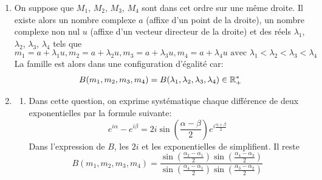 \begin{enumerate}
 \item On suppose que $M_1$, $M_2$, $M_3$, $M_4$ sont dans cet ordre sur une même droite. Il existe alors un nombre complexe $a$ (affixe d'un point de la droite), un nombre complexe non nul $u$ (affixe d'un vecteur directeur de la droite) et des réels $\lambda_1$, $\lambda_2$, $\lambda_3$, $\lambda_4$ tels que
\begin{displaymath}
 m_1=a+\lambda_1u,m_2=a+\lambda_2u, m_3=a+\lambda_3u, m_4=a+\lambda_4u \text{ avec }
\lambda_1 < \lambda_2 < \lambda_3 < \lambda_4  
\end{displaymath}
La famille est alors dans une configuration d'égalité car:
\begin{displaymath}
 B(m_1,m_2,m_3,m_4) = B(\lambda_1,\lambda_2,\lambda_3,\lambda_4)\in \mathbb{R}_+^*
\end{displaymath}

 \item 
\begin{enumerate}
 \item Dans cette question, on exprime systématique chaque différence de deux exponentielles par la formule suivante:
\begin{displaymath}
 e^{i\alpha}-e^{i\beta} = 2i\sin(\frac{\alpha - \beta}{2})e^{i\frac{\alpha + \beta}{2}}
\end{displaymath}
Dans l'expression de $B$, les $2i$ et les exponentielles de simplifient. Il reste
\begin{displaymath}
 B(m_1,m_2,m_3,m_4)=\frac{\sin\left(\frac{\alpha_2 - \alpha_1}{2}\right) \sin\left(\frac{\alpha_4 - \alpha_3}{2}\right)}
                         {\sin\left(\frac{\alpha_4 - \alpha_1}{2}\right) \sin\left(\frac{\alpha_3 - \alpha_2}{2}\right)}
\end{displaymath}
 

\end{enumerate}
\end{enumerate}
